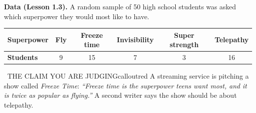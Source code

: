 %

\newcommand{\posterrule}{All five $=$ E.\quad Three or four $=$ P.\quad Fewer $=$ I.}
\newcommand{\sketchtitle}[1]{\textbf{Sketch the graph here first.} #1\par\smallskip}
\newcommand{\draftline}{\par\medskip\textbf{Draft the poster sentences here.} Every sentence names the context and uses a number from the graph.}



\textbf{Data (Lesson 1.3).} A random sample of 50 high school students was asked which superpower they would most like to have.

\begin{center}
\begin{tabular}{|l|c|c|c|c|c|}\hline
\textbf{Superpower} & Fly & Freeze time & Invisibility & Super strength & Telepathy \\ \hline
\textbf{Students} & 9 & 15 & 7 & 3 & 16 \\ \hline
\end{tabular}
\end{center}

\begin{callout}{\IconWarn\ THE CLAIM YOU ARE JUDGING}{calloutred}
A streaming service is pitching a show called \emph{Freeze Time}: \emph{``Freeze time is the superpower teens want most, and it is twice as popular as flying.''} A second writer says the show should be about telepathy.
\end{callout}

